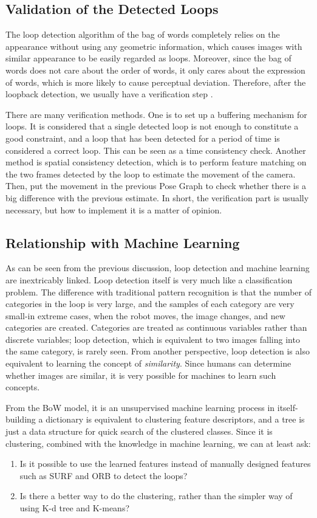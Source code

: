 \subsection{Validation of the Detected Loops}
The loop detection algorithm of the bag of words completely relies on the appearance without using any geometric information, which causes images with similar appearance to be easily regarded as loops. Moreover, since the bag of words does not care about the order of words, it only cares about the expression of words, which is more likely to cause perceptual deviation. Therefore, after the loopback detection, we usually have a verification step {\cite{Latif2013, Cadena2012}}.

There are many verification methods. One is to set up a buffering mechanism for loops. It is considered that a single detected loop is not enough to constitute a good constraint, and a loop that has been detected for a period of time is considered a correct loop. This can be seen as a time consistency check. Another method is spatial consistency detection, which is to perform feature matching on the two frames detected by the loop to estimate the movement of the camera. Then, put the movement in the previous Pose Graph to check whether there is a big difference with the previous estimate. In short, the verification part is usually necessary, but how to implement it is a matter of opinion.

\subsection{Relationship with Machine Learning}
As can be seen from the previous discussion, loop detection and machine learning are inextricably linked. Loop detection itself is very much like a classification problem. The difference with traditional pattern recognition is that the number of categories in the loop is very large, and the samples of each category are very small-in extreme cases, when the robot moves, the image changes, and new categories are created. Categories are treated as continuous variables rather than discrete variables; loop detection, which is equivalent to two images falling into the same category, is rarely seen. From another perspective, loop detection is also equivalent to learning the concept of \textit{similarity}. Since humans can determine whether images are similar, it is very possible for machines to learn such concepts.

From the BoW model, it is an unsupervised machine learning process in itself-building a dictionary is equivalent to clustering feature descriptors, and a tree is just a data structure for quick search of the clustered classes. Since it is clustering, combined with the knowledge in machine learning, we can at least ask:
\begin{enumerate}
	\item Is it possible to use the learned features instead of manually designed features such as SURF and ORB to detect the loops?
	\item Is there a better way to do the clustering, rather than the simpler way of using K-d tree and K-means?
\end{enumerate}

